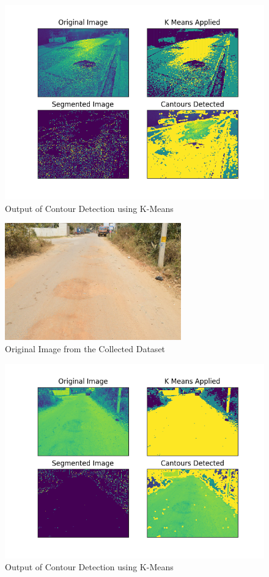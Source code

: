 \documentclass[12pt,a4paper]{article}
\begin{document}
\begin{itemize}
    \begin{figure}[ht!]
        \centering
        \includegraphics[width = 5in]{images/kmeans_1.png}
        \caption{Output of Contour Detection using K-Means}
    \end{figure}
    \pagebreak
    
    \begin{figure}[ht!]
        \centering
        \includegraphics[width = 3in]{images/road_cam_14.jpg}
        \caption{Original Image from the Collected Dataset}
    \end{figure}

    \begin{figure}[ht!]
        \centering
        \includegraphics[width = 5in]{images/kmeans_2.png}
        \caption{Output of Contour Detection using K-Means}
    \end{figure}
    \pagebreak
    

\end{itemize}
\end{document}

